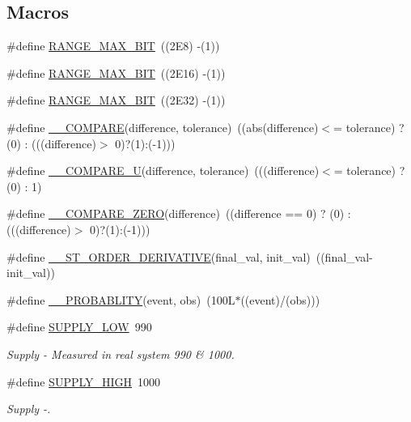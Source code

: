 \subsection*{Macros}
\begin{DoxyCompactItemize}
\item 
\#define \hyperlink{a00021_ae0c75a1cb44e5d3f00ec7c9e40acfda8}{R\+A\+N\+G\+E\+\_\+\+M\+A\+X\+\_\+B\+I\+T}~((2\+E8)  -\/(1))
\item 
\#define \hyperlink{a00021_ae01726ef8ba0a9e1fe8655dc382ecda8}{R\+A\+N\+G\+E\+\_\+\+M\+A\+X\+\_\+B\+I\+T}~((2\+E16) -\/(1))
\item 
\#define \hyperlink{a00021_a334bd006b6d2b397dbfc620d62c3c35c}{R\+A\+N\+G\+E\+\_\+\+M\+A\+X\+\_\+B\+I\+T}~((2\+E32) -\/(1))
\item 
\#define \hyperlink{a00021_a1aaf79017d1250538fff385827b7401e}{\+\_\+\+\_\+\+C\+O\+M\+P\+A\+R\+E}(difference, tolerance)~((abs(difference)$<$= tolerance) ? (0) \+: (((difference)$>$ 0)?(1)\+:(-\/1)))
\item 
\#define \hyperlink{a00021_a2ec57e7d50ba444ecb9e5c8b717d832d}{\+\_\+\+\_\+\+C\+O\+M\+P\+A\+R\+E\+\_\+\+U}(difference, tolerance)~(((difference)$<$= tolerance) ? (0) \+: 1)
\item 
\#define \hyperlink{a00021_ad4d76cc0f801d947fd957435649b95bc}{\+\_\+\+\_\+\+C\+O\+M\+P\+A\+R\+E\+\_\+\+Z\+E\+R\+O}(difference)~((difference == 0) ? (0) \+: (((difference)$>$ 0)?(1)\+:(-\/1)))
\item 
\#define \hyperlink{a00021_ac57756fe3d634c3c5a1af000271d40e5}{\+\_\+\+\_\+S\+T\+\_\+\+O\+R\+D\+E\+R\+\_\+\+D\+E\+R\+I\+V\+A\+T\+I\+V\+E}(final\+\_\+val, init\+\_\+val)~((final\+\_\+val-\/init\+\_\+val))
\item 
\#define \hyperlink{a00021_ab2185512402ea26115af112ce48175b2}{\+\_\+\+\_\+\+P\+R\+O\+B\+A\+B\+L\+I\+T\+Y}(event, obs)~(100\+L$\ast$((event)/(obs)))
\item 
\#define \hyperlink{a00021_a7c28268c9463a51a0f1e27d3ac941c12}{S\+U\+P\+P\+L\+Y\+\_\+\+L\+O\+W}~990
\begin{DoxyCompactList}\small\item\em Supply -\/ Measured in real system 990 \& 1000. \end{DoxyCompactList}\item 
\#define \hyperlink{a00021_a338142762317568b3b258e83442c2986}{S\+U\+P\+P\+L\+Y\+\_\+\+H\+I\+G\+H}~1000
\begin{DoxyCompactList}\small\item\em Supply -\/. \end{DoxyCompactList}\item 

\end{DoxyCompactItemize}
